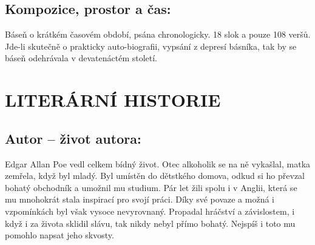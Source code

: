 \documentclass[A4paper]{extarticle} %
\begin{document}
\subsection*{Kompozice, prostor a čas:}
\noindent 
Báseň o krátkém časovém období, psána chronologicky. 18 slok a pouze 108 veršů. Jde-li skutečně o prakticky auto-biografii, vypsání z depresí básníka, tak by se báseň odehrávala v devatenáctém století.


\section*{LITERÁRNÍ HISTORIE}





\subsection*{Autor {\ssmall -- život autora:}}
\noindent 
Edgar Allan Poe vedl celkem bídný život. Otec alkoholik se na ně vykašlal, matka zemřela, když byl mladý. Byl umístěn do dětstkého domova, odkud si ho převzal bohatý obchodník a umožnil mu studium. Pár let žili spolu i v Anglii, která se mu mnohokrát stala inspirací pro svojí práci. Díky své povaze a možná i vzpomínkách byl však vysoce nevyrovnaný. Propadal hráčství a závislostem, i když i za života sklidil slávu, tak nikdy nebyl přímo bohatý. Nejspíš i toto mu pomohlo napsat jeho skvosty.
\end{document}
